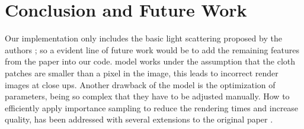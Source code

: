 \documentclass[12pt]{article}
\begin{document}
\FloatBarrier
\section{Conclusion and Future Work}

Our implementation only includes the basic light scattering proposed by the authors \cite{Sadeghi2013}; so a evident line of future work would be to add the remaining features from the paper into our code.
\citeauthor{Sadeghi2013} model works under the assumption that the cloth patches are smaller than a pixel in the image, this leads to incorrect render images at close ups.
Another drawback of the model is the optimization of parameters, being so complex that they have to be adjusted manually.
How to efficiently apply importance sampling to reduce the rendering times and increase quality, has been addressed with several extensions to the original paper \cite{Wang2014, Mizutani2014}.




\newpage


\end{document}
